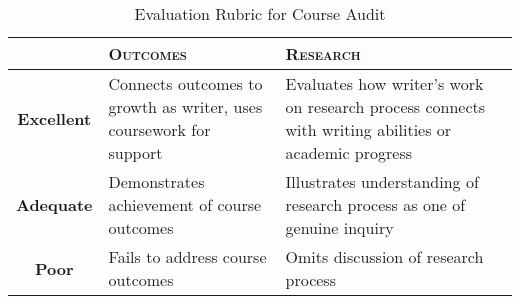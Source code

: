 \documentclass[9pt,twocolumn,oneside]{amsart}	%
\begin{document}
\begin{table}[b]
	\caption{Evaluation Rubric for Course Audit}\label{tab:rubric}
	\small
\begin{tabulary}{\columnwidth}{cLLL}
	\toprule  & \textbf{\textsc{Outcomes}} & \textbf{\textsc{Research}}\\
\midrule	\textbf{Excellent} 
& Connects outcomes to growth as writer, uses coursework for support 
& Evaluates how writer's work on research process connects with writing abilities or academic progress \\
\midrule	\textbf{Adequate} 
& Demonstrates achievement of course outcomes 
& Illustrates understanding of research process as one of genuine inquiry \\
\midrule	\textbf{Poor} 
& Fails to address course outcomes 
& Omits discussion of research process \\
	\bottomrule
\end{tabulary}
\end{table}

\end{document}

